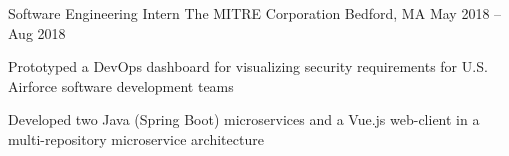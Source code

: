 \begin{cventries}
  \cventry
  {Software Engineering Intern}
  {The MITRE Corporation}
  {Bedford, MA}
  {May 2018 -- Aug 2018}
  {
    \begin{cvitems}
      \item {Prototyped a DevOps dashboard for visualizing security requirements for U.S. Airforce software development teams}
      \item {Developed two Java (Spring Boot) microservices and a Vue.js web-client in a multi-repository microservice architecture}
    \end{cvitems}
  }




\end{cventries}